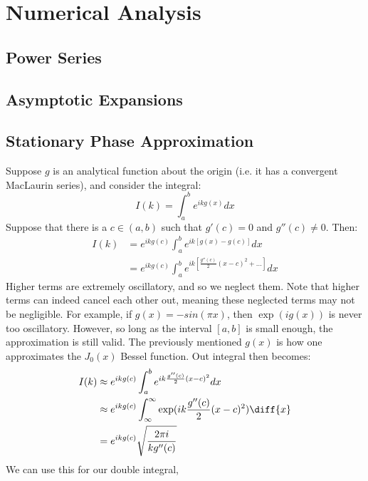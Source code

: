 \chapter{Numerical Analysis}
    \section{Power Series}
    \section{Asymptotic Expansions}
    \section{Stationary Phase Approximation}
        Suppose $g$ is an analytical function about
        the origin (i.e. it has a convergent MacLaurin series),
        and consider the integral:
        \begin{equation}
            I(k) = \int_{a}^{b}e^{ikg(x)}dx
        \end{equation}
        Suppose that there is a $c\in(a,b)$ such
        that $g'(c)=0$ and $g''(c)\ne 0$. Then:
        \begin{align}
            \nonumber I(k)&=e^{ikg(c)}\int_{a}^{b}e^{ik[g(x)-g(c)]}dx\\
            &=e^{ikg(c)}\int_{a}^{b}e^{ik[\frac{g''(c)}{2}(x-c)^{2}+\hdots]}dx
        \end{align}
        Higher terms are extremely oscillatory, and so we neglect them.
        Note that higher terms can indeed cancel each
        other out, meaning these neglected terms may
        not be negligible. For example, if
        $g(x)=-sin(\pi x)$, then $\exp(ig(x))$ is never
        too oscillatory. However, so long as the interval
        $[a,b]$ is small enough, the approximation is still
        valid. The previously mentioned $g(x)$ is how
        one approximates the $J_{0}(x)$ Bessel function.
        Out integral then becomes:
        \begin{align}
            I(k)&\approx e^{ikg(c)}
                    \int_{a}^{b}e^{ik\frac{g''(c)}{2}(x-c)^{2}}dx\\
                &\approx e^{ikg(c)}
                    \int_{\infty}^{\infty}
                    \exp(ik\frac{g''(c)}{2}(x-c)^{2})\diff{x}\\
                &=e^{ikg(c)}\sqrt{\frac{2\pi i}{kg''(c)}}
        \end{align}
        We can use this for our double integral,
